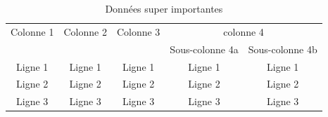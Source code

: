 \documentclass{article}
\begin{document}
\begin{table}[!h]\centering
\begin{tabular}{ccccc}
\toprule
     Colonne 1&Colonne 2&Colonne 3&\multicolumn{2}{c}{colonne 4}\\\cmidrule{4-5}
      &	 &	&	Sous-colonne 4a	&Sous-colonne 4b\\ \midrule
      Ligne 1	&Ligne 1&	Ligne 1&	Ligne 1&	Ligne 1\\
      Ligne 2	&Ligne 2&	Ligne 2	&Ligne 2&	Ligne 2\\
      Ligne 3	&Ligne 3&	Ligne 3	&Ligne 3&	Ligne 3\\
      \bottomrule
\end{tabular}
\label{Table 2}
\caption{Données super importantes}
\end{table}
\end{document}

